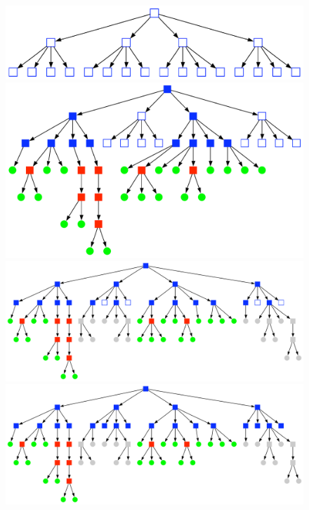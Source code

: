 \begin{figure}[htbp]
\begin{center}
\includegraphics[scale=0.35]{quadtree50_TPL2_stage1.pdf}\\ \vspace{1.0cm}
\includegraphics[scale=0.35]{quadtree50_TPL2_stage2a.pdf}\\
\includegraphics[scale=0.35]{quadtree50_TPL2_stage2b.pdf}\\
\includegraphics[scale=0.35]{quadtree50_TPL2_stage3.pdf}\\

\end{center}
\end{figure}
